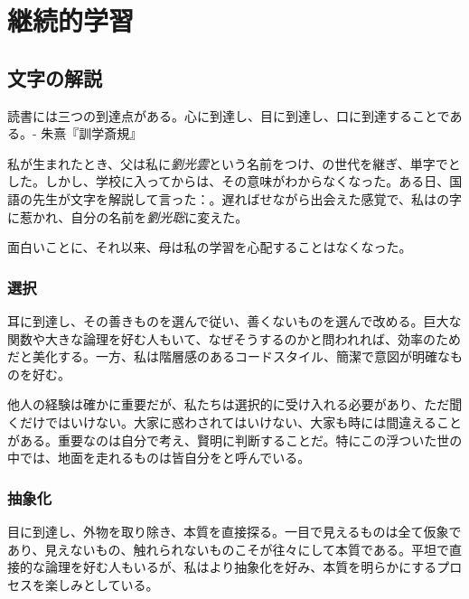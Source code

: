 \chapter{継続的学習} 
\label{ch:learning}


\section{文字の解説}

\begin{content}

\begin{remark}
読書には三つの到達点がある。心に到達し、目に到達し、口に到達することである。- 朱熹『訓学斎規』
\end{remark}

私が生まれたとき、父は私に\emph{劉光雲}という名前をつけ、の世代を継ぎ、単字でとした。しかし、学校に入ってからは、その意味がわからなくなった。ある日、国語の先生が文字を解説して言った：。遅ればせながら出会えた感覚で、私はの字に惹かれ、自分の名前を\emph{劉光聡}に変えた。

面白いことに、それ以来、母は私の学習を心配することはなくなった。

\subsection{選択}

耳に到達し、その善きものを選んで従い、善くないものを選んで改める。巨大な関数や大きな論理を好む人もいて、なぜそうするのかと問われれば、効率のためだと美化する。一方、私は階層感のあるコードスタイル、簡潔で意図が明確なものを好む。

他人の経験は確かに重要だが、私たちは選択的に受け入れる必要があり、ただ聞くだけではいけない。大家に惑わされてはいけない、大家も時には間違えることがある。重要なのは自分で考え、賢明に判断することだ。特にこの浮ついた世の中では、地面を走れるものは皆自分をと呼んでいる。

\subsection{抽象化}

目に到達し、外物を取り除き、本質を直接探る。一目で見えるものは全て仮象であり、見えないもの、触れられないものこそが往々にして本質である。平坦で直接的な論理を好む人もいるが、私はより抽象化を好み、本質を明らかにするプロセスを楽しみとしている。


\end{content}
